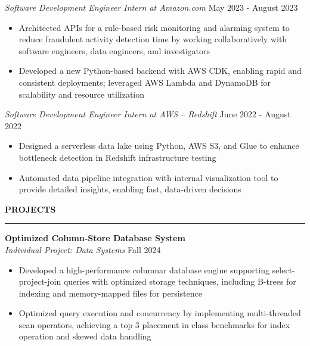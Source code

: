 \documentclass[11pt,a4paper]{article}
\newcommand{\sectionheading}[1]{\vspace{0.2cm}\textbf{\Large #1}\vspace{0.1cm}\hrule\vspace{0.3cm}}
\newcommand{\subheading}[1]{\textbf{#1}}
\newcommand{\daterange}[1]{\hfill{#1}}
\begin{document}
\textit{Software Development Engineer Intern at Amazon.com} \daterange{May 2023 - August 2023}
\begin{itemize}[leftmargin=*,nosep]
    \item Architected APIs for a rule-based risk monitoring and alarming system to reduce fraudulent activity detection time by working collaboratively with software engineers, data engineers, and investigators
    \item Developed a new Python-based backend with AWS CDK, enabling rapid and consistent deployments; leveraged AWS Lambda and DynamoDB for scalability and resource utilization
\end{itemize}

\textit{Software Development Engineer Intern at AWS -- Redshift} \daterange{June 2022 - August 2022}
\begin{itemize}[leftmargin=*,nosep]
    \item Designed a serverless data lake using Python, AWS S3, and Glue to enhance bottleneck detection in Redshift infrastructure testing
    \item Automated data pipeline integration with internal visualization tool to provide detailed insights, enabling fast, data-driven decisions
\end{itemize}

\sectionheading{PROJECTS}

\subheading{Optimized Column-Store Database System}\\
\textit{Individual Project: Data Systems} \daterange{Fall 2024}
\begin{itemize}[leftmargin=*,nosep]
    \item Developed a high-performance columnar database engine supporting select-project-join queries with optimized storage techniques, including B-trees for indexing and memory-mapped files for persistence
    \item Optimized query execution and concurrency by implementing multi-threaded scan operators, achieving a top 3 placement in class benchmarks for index operation and skewed data handling
\end{itemize}
\end{document}
